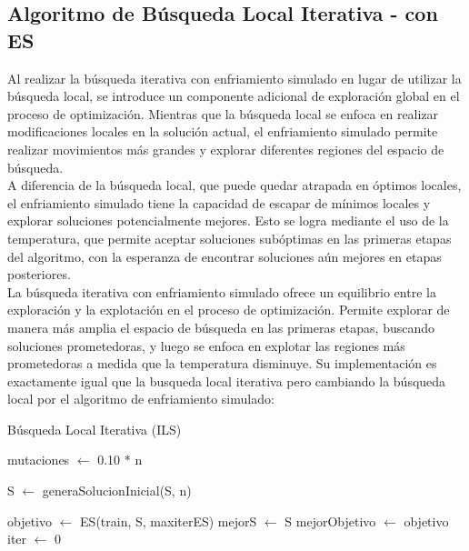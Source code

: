 \subsection{Algoritmo de Búsqueda Local Iterativa - con ES}
Al realizar la búsqueda iterativa con enfriamiento simulado en lugar de utilizar la búsqueda local, se introduce un componente adicional de exploración global en el proceso de optimización. Mientras que la búsqueda local se enfoca en realizar modificaciones locales en la solución actual, el enfriamiento simulado permite realizar movimientos más grandes y explorar diferentes regiones del espacio de búsqueda.\\

A diferencia de la búsqueda local, que puede quedar atrapada en óptimos locales, el enfriamiento simulado tiene la capacidad de escapar de mínimos locales y explorar soluciones potencialmente mejores. Esto se logra mediante el uso de la temperatura, que permite aceptar soluciones subóptimas en las primeras etapas del algoritmo, con la esperanza de encontrar soluciones aún mejores en etapas posteriores.\\

La búsqueda iterativa con enfriamiento simulado ofrece un equilibrio entre la exploración y la explotación en el proceso de optimización. Permite explorar de manera más amplia el espacio de búsqueda en las primeras etapas, buscando soluciones prometedoras, y luego se enfoca en explotar las regiones más prometedoras a medida que la temperatura disminuye. Su implementación es exactamente igual que la busqueda local iterativa pero cambiando la búsqueda local por el algoritmo de enfriamiento simulado:
\begin{algorithm}[H]
	\caption{Búsqueda Local Iterativa (ILS)}
	
	
	mutaciones $\leftarrow$ 0.10 * n\;
	\BlankLine
	
	S $\leftarrow$ generaSolucionInicial(S, n)
	
	objetivo $\leftarrow$ ES(train, S, maxiterES)\;
	\BlankLine
	mejorS $\leftarrow$ S\;
	mejorObjetivo $\leftarrow$ objetivo\;
	\BlankLine
	iter $\leftarrow$ 0\;
	
	\;
\end{algorithm}

